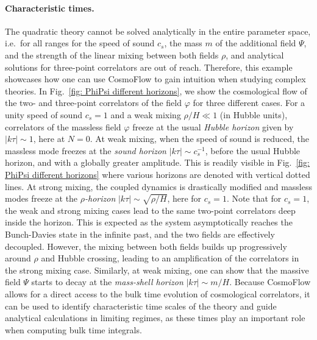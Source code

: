 \documentclass[11pt]{article}
\numberwithin{equation}{section} %
\begin{document}
\paragraph{Characteristic times.} The quadratic theory cannot be solved analytically in the entire parameter space, i.e.~for all ranges for the speed of sound $c_s$, the mass $m$ of the additional field $\Psi$, and the strength of the linear mixing between both fields $\rho$, and analytical solutions for three-point correlators are out of reach. Therefore, this example showcases how one can use \textsf{CosmoFlow} to gain intuition when studying complex theories. In Fig.~\ref{fig: PhiPsi different horizons}, we show the cosmological flow of the two- and three-point correlators of the field $\varphi$ for three different cases. For a unity speed of sound $c_s=1$ and a weak mixing $\rho/H \ll 1$ (in Hubble units), correlators of the massless field $\varphi$ freeze at the usual \textcolor{pyblue}{\textit{Hubble horizon}} given by $|k\tau| \sim 1$, here at $N=0$. At weak mixing, when the speed of sound is reduced, the massless mode freezes at the \textcolor{pyred}{\textit{sound horizon}} $|k\tau|\sim c_s^{-1}$, before the usual Hubble horizon, and with a globally greater amplitude. This is readily visible in Fig.~\ref{fig: PhiPsi different horizons} where various horizons are denoted with vertical dotted lines. At strong mixing, the coupled dynamics is drastically modified and massless modes freeze at the \textcolor{pygreen}{$\rho$\textit{-horizon}} $|k\tau|\sim \sqrt{\rho/H}$, here for $c_s=1$. Note that for $c_s=1$, the weak and strong mixing cases lead to the same two-point correlators deep inside the horizon. This is expected as the system asymptotically reaches the Bunch-Davies state in the infinite past, and the two fields are effectively decoupled. However, the mixing between both fields builds up progressively around $\rho$ and Hubble crossing, leading to an amplification of the correlators in the strong mixing case. Similarly, at weak mixing, one can show that the massive field $\Psi$ starts to decay at the \textit{mass-shell horizon} $|k\tau|\sim m/H$. Because \textsf{CosmoFlow} allows for a direct access to the bulk time evolution of cosmological correlators, it can be used to identify characteristic time scales of the theory and guide analytical calculations in limiting regimes, as these times play an important role when computing bulk time integrals.
\end{document}
